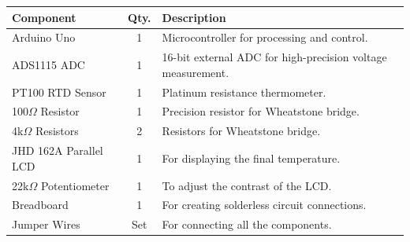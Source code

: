 
\begin{tabular}{|l|c|p{4cm}|}
    \hline
    \textbf{Component} & \textbf{Qty.} & \textbf{Description} \\
    \hline
    Arduino Uno & 1 & Microcontroller for processing and control. \\
    \hline
    ADS1115 ADC & 1 & 16-bit external ADC for high-precision voltage measurement. \\
    \hline
    PT100 RTD Sensor & 1 & Platinum resistance thermometer. \\
    \hline
    100$\Omega$ Resistor & 1 & Precision resistor for Wheatstone bridge. \\
    \hline
    4k$\Omega$ Resistors & 2 & Resistors for Wheatstone bridge. \\
    \hline
    JHD 162A Parallel LCD & 1 & For displaying the final temperature. \\
    \hline
    22k$\Omega$ Potentiometer & 1 & To adjust the contrast of the LCD. \\
    \hline
    Breadboard & 1 & For creating solderless circuit connections. \\
    \hline
    Jumper Wires & Set & For connecting all the components. \\
    \hline
\end{tabular}
